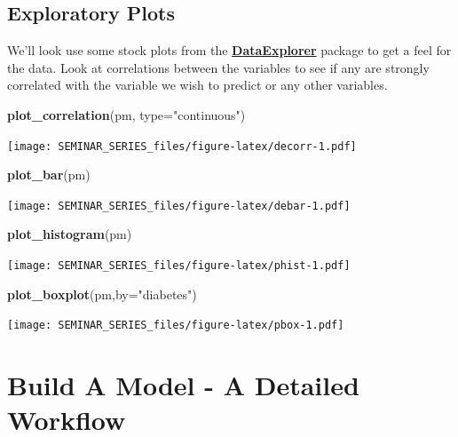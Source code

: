 \documentclass[
]{book}
\newenvironment{Shaded}{\begin{snugshade}}{\end{snugshade}}
\newcommand{\DataTypeTok}[1]{\textcolor[rgb]{0.13,0.29,0.53}{#1}}
\newcommand{\KeywordTok}[1]{\textcolor[rgb]{0.13,0.29,0.53}{\textbf{#1}}}
\newcommand{\NormalTok}[1]{#1}
\newcommand{\StringTok}[1]{\textcolor[rgb]{0.31,0.60,0.02}{#1}}
\begin{document}
\hypertarget{exploratory-plots}{%
\section{Exploratory Plots}\label{exploratory-plots}}

We'll look use some stock plots from the \href{https://github.com/elastacloud/automatic-data-explorer}{\textbf{DataExplorer}} package to get a feel for the data. Look at correlations between the variables to see if any are strongly correlated with the variable we wish to predict or any other variables.

\begin{Shaded}
\begin{Highlighting}[]
\KeywordTok{plot_correlation}\NormalTok{(pm, }\DataTypeTok{type=}\StringTok{"continuous"}\NormalTok{)}
\end{Highlighting}
\end{Shaded}

\texttt{[image: SEMINAR\_SERIES\_files/figure-latex/decorr-1.pdf]}

\begin{Shaded}
\begin{Highlighting}[]
\KeywordTok{plot_bar}\NormalTok{(pm)}
\end{Highlighting}
\end{Shaded}

\texttt{[image: SEMINAR\_SERIES\_files/figure-latex/debar-1.pdf]}

\begin{Shaded}
\begin{Highlighting}[]
\KeywordTok{plot_histogram}\NormalTok{(pm)}
\end{Highlighting}
\end{Shaded}

\texttt{[image: SEMINAR\_SERIES\_files/figure-latex/phist-1.pdf]}

\begin{Shaded}
\begin{Highlighting}[]
\KeywordTok{plot_boxplot}\NormalTok{(pm,}\DataTypeTok{by=}\StringTok{"diabetes"}\NormalTok{)}
\end{Highlighting}
\end{Shaded}

\texttt{[image: SEMINAR\_SERIES\_files/figure-latex/pbox-1.pdf]}

\hypertarget{build-a-model---a-detailed-workflow}{%
\chapter{Build A Model - A Detailed Workflow}\label{build-a-model---a-detailed-workflow}}
\end{document}
